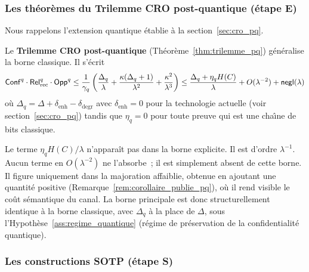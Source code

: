 \begin{sloppypar}
\subsubsection{Les th\'eor\`emes du Trilemme CRO post-quantique (\'etape E)}
\label{subsubsec:resultats_etape_E}

Nous rappelons l'extension quantique \'etablie \`a la
section~\ref{sec:cro_pq}.

Le \textbf{Trilemme CRO post-quantique}
(Th\'eor\`eme~\ref{thm:trilemme_pq}) g\'en\'eralise la borne classique. Il s'\'ecrit
\begin{equation}
\mathsf{Conf}^q \cdot \mathsf{Rel}_{\mathrm{rec}}^q \cdot \mathsf{Opp}^q \leq \frac{1}{\gamma_q}\left(\frac{\Delta_q}{\lambda} + \frac{\kappa(\Delta_q+1)}{\lambda^2} + \frac{\kappa^2}{\lambda^3}\right) \leq \frac{\Delta_q + \eta_q H(C)}{\lambda} + O(\lambda^{-2}) + \mathsf{negl}(\lambda)
\label{eq:trilemme_pq_resultat_precise}
\end{equation}
o\`u $\Delta_q = \Delta + \delta_{\text{enh}} - \delta_{\text{degr}}$
avec $\delta_{\text{enh}} = 0$ pour la technologie actuelle (voir
section~\ref{sec:cro_pq}) tandis que $\eta_q = 0$ pour toute preuve qui est une
cha\^{\i}ne de bits classique.

\begin{remark}
\label{rem:portee_borne_pq_precisee}
Le terme $\eta_q H(C)/\lambda$ n'appara\^it pas dans la borne explicite.
Il est d'ordre $\lambda^{-1}$. Aucun terme en
$O(\lambda^{-2})$ ne l'absorbe~; il est simplement absent de cette borne. Il figure uniquement dans
la majoration affaiblie, obtenue en ajoutant une quantit\'e positive
(Remarque~\ref{rem:corollaire_publie_pq}),
o\`u il rend visible le co\^ut s\'emantique du canal. La borne principale
est donc structurellement identique \`a la borne classique, avec
$\Delta_q$ \`a la place de $\Delta$, sous
l'Hypoth\`ese~\ref{ass:regime_quantique} (r\'egime de pr\'eservation de
la confidentialit\'e quantique).
\end{remark}

\subsubsection{Les constructions SOTP (\'etape S)}
\label{subsubsec:resultats_etape_S}


\end{sloppypar}
